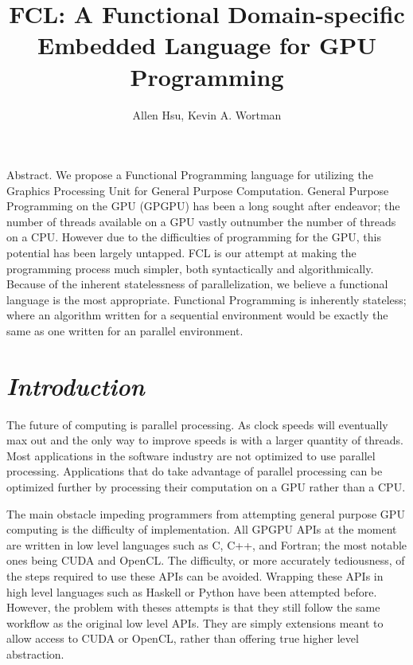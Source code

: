 \documentclass{article}
\author{Allen Hsu, Kevin A. Wortman}
\begin{document}
\title{FCL: A Functional Domain-specific Embedded Language for GPU Programming}

\date{}

\begingroup
\let\center\flushleft
\let\endcenter\endflushleft
\maketitle
\endgroup

{\raggedright{}
\noindent
Abstract. We propose a Functional Programming language for utilizing the Graphics
Processing Unit for General Purpose Computation. General Purpose Programming
on the GPU (GPGPU) has been a long sought after endeavor; the number of threads
available on a GPU vastly outnumber the number of threads on a CPU. However
due to the difficulties of programming for the GPU, this potential has been
largely untapped. FCL is our attempt at making the programming process much
simpler, both syntactically and algorithmically. Because of the inherent
statelessness of parallelization, we believe a functional language is the most
appropriate. Functional Programming is inherently stateless; where an
algorithm written for a sequential environment would be exactly the same as one
written for an parallel environment.
}

\section{\emph{Introduction}}

\paragraph{}

The future of computing is parallel processing. As clock speeds will eventually
max out and the only way to improve speeds is with a larger quantity of threads.
Most applications in the software industry are not optimized to use parallel
processing. Applications that do take advantage of parallel processing can be
optimized further by processing their computation on a GPU rather than a CPU.

The main obstacle impeding programmers from attempting general purpose GPU
computing is the difficulty of implementation. All GPGPU APIs at the moment are
written in low level languages such as C, C++, and Fortran; the most notable ones
being CUDA and OpenCL. The difficulty, or
more accurately tediousness, of the steps required to use these APIs can be avoided.
Wrapping these APIs in high level languages such as Haskell or Python
have been attempted before. However, the problem with theses attempts is that they
still follow the same workflow as the original low level APIs. They are simply
extensions meant to allow access to CUDA or OpenCL, rather than offering true
higher level abstraction.
\end{document}
